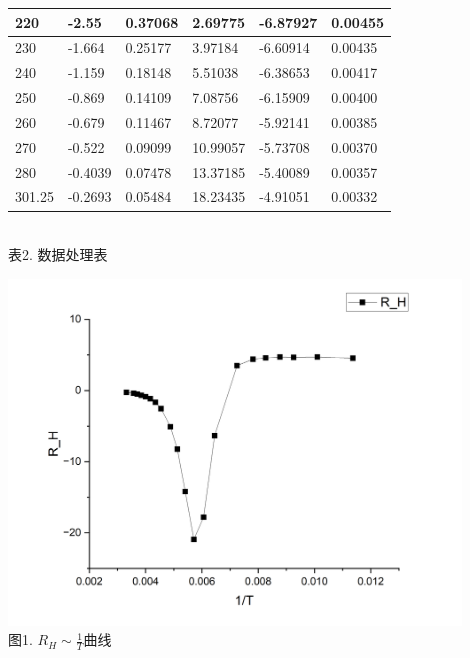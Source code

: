 \documentclass[UTF8]{ctexart}
\begin{document}
\begin{table}[!ht]
\begin{tabular}{|l|l|l|l|l|l|}
        220 & -2.55 & 0.37068 & 2.69775 & -6.87927 & 0.00455 \\ \hline
        230 & -1.664 & 0.25177 & 3.97184 & -6.60914 & 0.00435 \\ \hline
        240 & -1.159 & 0.18148 & 5.51038 & -6.38653 & 0.00417 \\ \hline
        250 & -0.869 & 0.14109 & 7.08756 & -6.15909 & 0.00400 \\ \hline
        260 & -0.679 & 0.11467 & 8.72077 & -5.92141 & 0.00385 \\ \hline
        270 & -0.522 & 0.09099 & 10.99057 & -5.73708 & 0.00370 \\ \hline
        280 & -0.4039 & 0.07478 & 13.37185 & -5.40089 & 0.00357 \\ \hline
        301.25 & -0.2693 & 0.05484 & 18.23435 & -4.91051 & 0.00332 \\ \hline
    \end{tabular}\\
    表2. 数据处理表
\end{table}
\begin{minipage}[!ht]{0.8\linewidth}
    \centering
    \includegraphics[width=0.9\textwidth]{R.png}\\
    {\small{
        图1. $R_H\sim \frac 1T$曲线
    }}
    \vspace{10pt}
\end{minipage}\\
\end{document}
